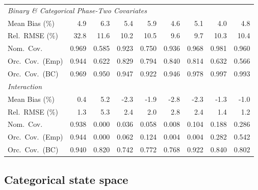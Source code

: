\begin{table}[!htbp]
{\begin{tabular}{lrrrrrrrr}
\midrule
\multicolumn{9}{l}{\textit{Binary \& Categorical Phase-Two Covariates}} \\[2pt]
\quad Mean Bias (\%) & 4.9 & 6.3 & 5.4 & 5.9 & \cellcolor{ranktwo}4.6 & 5.1 & \cellcolor{rankone}4.0 & \cellcolor{rankthree}4.8 \\
\quad Rel.\ RMSE (\%) & 32.8 & 11.6 & \cellcolor{rankthree}10.2 & 10.5 & \cellcolor{rankone}9.6 & \cellcolor{ranktwo}9.7 & 10.3 & 10.4 \\
\quad Nom.\ Cov. & 0.969 & 0.585 & 0.923 & 0.750 & \cellcolor{ranktwo}0.936 & \cellcolor{rankthree}0.968 & 0.981 & \cellcolor{rankone}0.960 \\
\quad Orc.\ Cov.\ (Emp) & 0.944 & 0.622 & \cellcolor{ranktwo}0.829 & 0.794 & \cellcolor{rankone}0.840 & \cellcolor{rankthree}0.814 & 0.632 & 0.566 \\
\quad Orc.\ Cov.\ (BC) & 0.969 & 0.950 & \cellcolor{rankone}0.947 & \cellcolor{rankthree}0.922 & \cellcolor{ranktwo}0.946 & \cellcolor{rankthree}0.978 & 0.997 & 0.993 \\
\midrule
\multicolumn{9}{l}{\textit{Interaction}} \\[2pt]
\quad Mean Bias (\%) & 0.4 & 5.2 & -2.3 & \cellcolor{rankthree}-1.9 & -2.8 & -2.3 & \cellcolor{ranktwo}-1.3 & \cellcolor{rankone}-1.0 \\
\quad Rel.\ RMSE (\%) & 1.3 & 5.3 & 2.4 & \cellcolor{rankthree}2.0 & 2.8 & 2.4 & \cellcolor{ranktwo}1.4 & \cellcolor{rankone}1.2 \\
\quad Nom.\ Cov. & 0.938 & 0.000 & 0.036 & 0.058 & 0.008 & \cellcolor{rankthree}0.104 & \cellcolor{ranktwo}0.188 & \cellcolor{rankone}0.286 \\
\quad Orc.\ Cov.\ (Emp) & 0.944 & 0.000 & 0.062 & \cellcolor{rankthree}0.124 & 0.004 & 0.004 & \cellcolor{ranktwo}0.282 & \cellcolor{rankone}0.542 \\
\quad Orc.\ Cov.\ (BC) & 0.940 & 0.820 & 0.742 & 0.772 & 0.768 & \cellcolor{rankone}0.922 & \cellcolor{ranktwo}0.840 & \cellcolor{rankthree}0.802 \\
\bottomrule
\end{tabular}}
\end{table}

\subsection{Categorical state space}
\label{sec:sird_ablation_cat}

